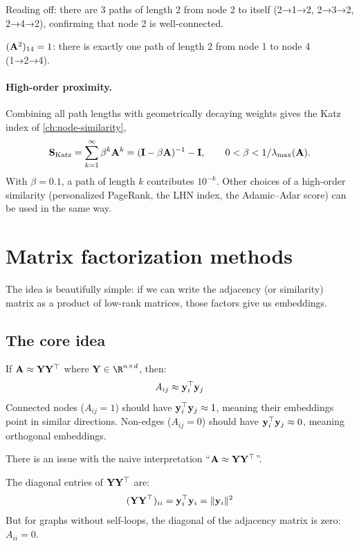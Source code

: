 \begin{notechapter}
\begin{example}
Reading off: there are 3 paths of length 2 from node 2 to itself (2→1→2, 2→3→2, 2→4→2), confirming that node 2 is well-connected.

$(\mathbf{A}^2)_{14} = 1$: there is exactly one path of length 2 from node 1 to node 4 (1→2→4).
\end{example}

\paragraph{High-order proximity.} Combining all path lengths with geometrically decaying weights gives the Katz index of \cref{ch:node-similarity},
\[
\mathbf{S}_{\text{Katz}} = \sum_{k=1}^{\infty} \beta^k \mathbf{A}^k = (\mathbf{I} - \beta\mathbf{A})^{-1} - \mathbf{I}, \qquad 0 < \beta < 1/\lambda_{\max}(\mathbf{A}).
\]
With $\beta = 0.1$, a path of length $k$ contributes $10^{-k}$. Other choices of a high-order similarity (personalized PageRank, the LHN index, the Adamic--Adar score) can be used in the same way.

\section{Matrix factorization methods}

The idea is beautifully simple: if we can write the adjacency (or similarity) matrix as a product of low-rank matrices, those factors give us embeddings.

\subsection{The core idea}

\begin{keyidea}
If $\mathbf{A} \approx \mathbf{Y} \mathbf{Y}^\top$ where $\embed \in \R^{n \times d}$, then:
\[
A_{ij} \approx \mathbf{y}_i^\top \mathbf{y}_j
\]
Connected nodes ($A_{ij} = 1$) should have $\mathbf{y}_i^\top \mathbf{y}_j \approx 1$, meaning their embeddings point in similar directions. Non-edges ($A_{ij} = 0$) should have $\mathbf{y}_i^\top \mathbf{y}_j \approx 0$, meaning orthogonal embeddings.
\end{keyidea}

\begin{pitfall}
There is an issue with the naive interpretation ``$\mathbf{A} \approx \mathbf{Y}\mathbf{Y}^\top$''.

The diagonal entries of $\mathbf{Y} \mathbf{Y}^\top$ are:
\[
(\mathbf{Y} \mathbf{Y}^\top)_{ii} = \mathbf{y}_i^\top \mathbf{y}_i = \|\mathbf{y}_i\|^2
\]
But for graphs without self-loops, the diagonal of the adjacency matrix is zero: $A_{ii} = 0$.


\end{pitfall}
\end{notechapter}
